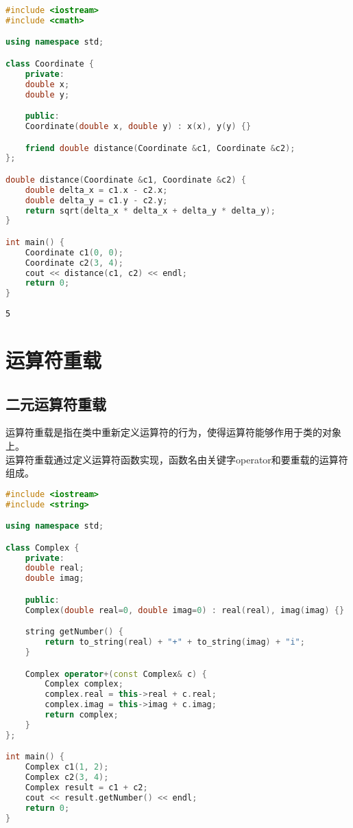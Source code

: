 
\begin{lstlisting}[language=C++]
#include <iostream>
#include <cmath>

using namespace std;

class Coordinate {
    private:
    double x;
    double y;

    public:
    Coordinate(double x, double y) : x(x), y(y) {}

    friend double distance(Coordinate &c1, Coordinate &c2);
};

double distance(Coordinate &c1, Coordinate &c2) {
    double delta_x = c1.x - c2.x;
    double delta_y = c1.y - c2.y;
    return sqrt(delta_x * delta_x + delta_y * delta_y);
}

int main() {
    Coordinate c1(0, 0);
    Coordinate c2(3, 4);
    cout << distance(c1, c2) << endl;
    return 0;
}
\end{lstlisting}

\begin{tcolorbox}
    \begin{verbatim}
5
	\end{verbatim}
\end{tcolorbox}

\newpage

\section{运算符重载}

\subsection{二元运算符重载}

运算符重载是指在类中重新定义运算符的行为，使得运算符能够作用于类的对象上。\\

运算符重载通过定义运算符函数实现，函数名由关键字operator和要重载的运算符组成。\\


\begin{lstlisting}[language=C++]
#include <iostream>
#include <string>

using namespace std;

class Complex {
    private:
    double real;
    double imag;

    public:
    Complex(double real=0, double imag=0) : real(real), imag(imag) {}

    string getNumber() {
        return to_string(real) + "+" + to_string(imag) + "i";
    }

    Complex operator+(const Complex& c) {
        Complex complex;
        complex.real = this->real + c.real;
        complex.imag = this->imag + c.imag;
        return complex;
    }
};

int main() {
    Complex c1(1, 2);
    Complex c2(3, 4);
    Complex result = c1 + c2;
    cout << result.getNumber() << endl;
    return 0;
}
\end{lstlisting}

